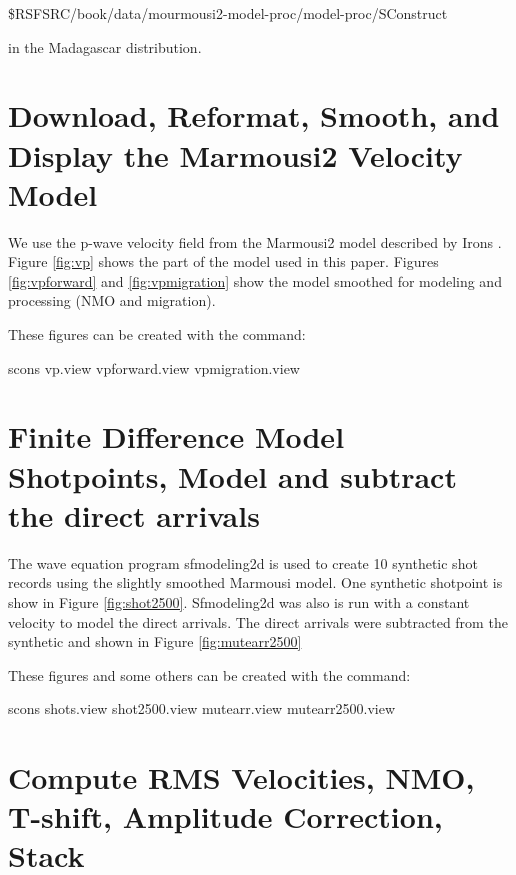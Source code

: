  \$RSFSRC/book/data/mourmousi2-model-proc/model-proc/SConstruct 

in the Madagascar distribution.

\section{Download, Reformat, Smooth, and Display the Marmousi2 Velocity Model}
We use the p-wave velocity field from the Marmousi2 model described by Irons 
\cite[]{irons}.  Figure \ref{fig:vp} shows the part of the model used in this 
paper.  Figures \ref{fig:vpforward} and \ref{fig:vpmigration} show the model 
smoothed for modeling and processing (NMO and migration). 

These figures can be created with the command:

scons vp.view vpforward.view vpmigration.view


\section{Finite Difference Model Shotpoints, Model and subtract the direct arrivals}

The wave equation program sfmodeling2d \cite[]{Yang} is used to create 10 
synthetic shot records using the slightly smoothed Marmousi model.   One 
synthetic shotpoint is show in Figure \ref{fig:shot2500}. Sfmodeling2d was also
is run with a constant velocity to model the direct arrivals.  The direct 
arrivals were subtracted from the synthetic and shown in Figure 
\ref{fig:mutearr2500} 

These figures and some others can be created with the command:

scons shots.view shot2500.view mutearr.view mutearr2500.view


\section{Compute RMS Velocities, NMO, T-shift, Amplitude Correction, Stack}

